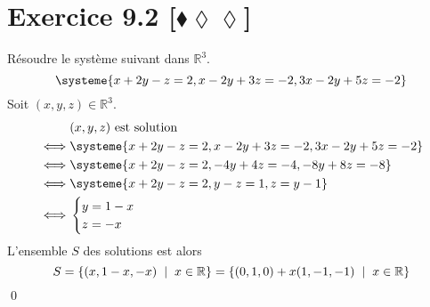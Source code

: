 \documentclass[10pt]{article}
\begin{document}

\section*{Exercice 9.2 [$\blacklozenge\lozenge\lozenge$]}
\begin{tcolorbox}[enhanced, width=7in, center, size=fbox, fontupper=\large, drop shadow southwest]
    Résoudre le système suivant dans $\mathbb{R}^3$.
    \begin{equation*}
        \systeme{
            x+2y-z=2,
            x-2y+3z=-2,
            3x-2y+5z=-2
        }
    \end{equation*}
    Soit $(x,y,z)\in\mathbb{R}^3$.
    \begin{align*}
        &(x,y,z) \text{ est solution}\\
        \iff&
        \systeme{
            x+2y-z=2,
            x-2y+3z=-2,
            3x-2y+5z=-2
        }\\ \iff&
        \systeme{
            x+2y-z=2,
            -4y+4z=-4,
            -8y+8z=-8
        }\\ \iff&
        \systeme{
            x+2y-z=2,
            y - z = 1,
            z = y - 1
        }\\ \iff&
        \begin{cases}
            y=1-x\\
            z=-x
        \end{cases}\\
    \end{align*}
    L'ensemble $S$ des solutions est alors 
    \begin{equation*}
        S = \left\{(x, 1-x, -x) \hspace{0.2cm} | \hspace{0.2cm} x \in \mathbb{R}\right\} = \left\{(0, 1, 0) + x(1,-1,-1) \hspace{0.2cm} | \hspace{0.2cm} x\in\mathbb{R}\right\}
    \end{equation*}
    \qed
\end{tcolorbox}

\end{document}
